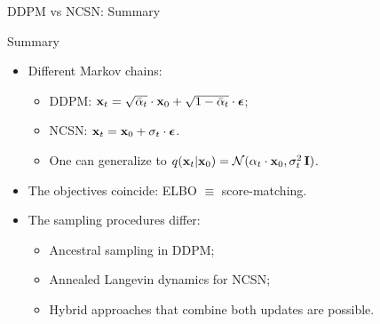 \documentclass{beamer}
\begin{document}
\begin{frame}{DDPM vs NCSN: Summary}
	\begin{block}{Summary}
		\begin{itemize}
		\item Different Markov chains:
			\begin{itemize}
				\item DDPM: $\mathbf{x}_t = \sqrt{\bar{\alpha}_t} \cdot \mathbf{x}_0 + \sqrt{1 - \bar{\alpha}_t} \cdot \boldsymbol{\epsilon}$;
				\item NCSN: $\mathbf{x}_t = \mathbf{x}_0 + \sigma_t \cdot \boldsymbol{\epsilon}$.
				\item One can generalize to $q(\mathbf{x}_t |\mathbf{x}_0) = \mathcal{N}(\alpha_t \cdot \mathbf{x}_0, \sigma^2_t\, \mathbf{I})$.
			\end{itemize}
		\item The objectives coincide: ELBO $\equiv$ score-matching.
		\item The sampling procedures differ:
			\begin{itemize}
				\item Ancestral sampling in DDPM;
				\item Annealed Langevin dynamics for NCSN;
				\item Hybrid approaches that combine both updates are possible.
			\end{itemize}
		\end{itemize}
	\end{block}
\end{frame}
\end{document}
